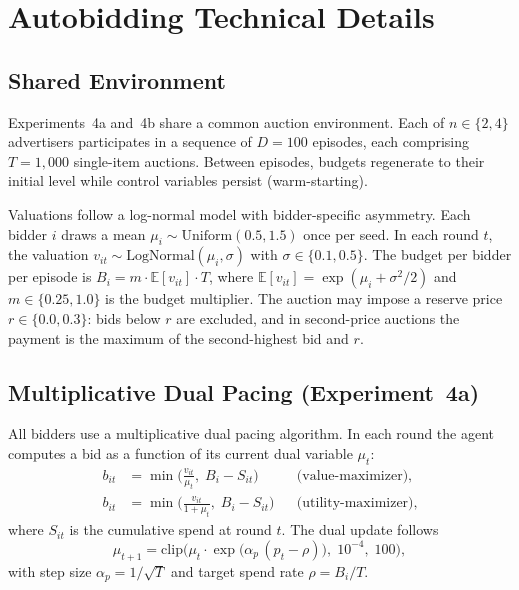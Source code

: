 \section{Autobidding Technical Details}
\label{sec:exp4_appendix}

\subsection{Shared Environment}

Experiments~4a and~4b share a common auction environment. Each of $n \in \{2, 4\}$ advertisers participates in a sequence of $D = 100$ episodes, each comprising $T = 1{,}000$ single-item auctions. Between episodes, budgets regenerate to their initial level while control variables persist (warm-starting).

Valuations follow a log-normal model with bidder-specific asymmetry. Each bidder $i$ draws a mean $\mu_i \sim \mathrm{Uniform}(0.5, 1.5)$ once per seed. In each round $t$, the valuation $v_{it} \sim \mathrm{LogNormal}(\mu_i, \sigma)$ with $\sigma \in \{0.1, 0.5\}$. The budget per bidder per episode is $B_i = m \cdot \mathbb{E}[v_{it}] \cdot T$, where $\mathbb{E}[v_{it}] = \exp(\mu_i + \sigma^2/2)$ and $m \in \{0.25, 1.0\}$ is the budget multiplier. The auction may impose a reserve price $r \in \{0.0, 0.3\}$: bids below $r$ are excluded, and in second-price auctions the payment is the maximum of the second-highest bid and $r$.

\subsection{Multiplicative Dual Pacing (Experiment~4a)}
\label{sec:exp4a_appendix}

All bidders use a multiplicative dual pacing algorithm. In each round the agent computes a bid as a function of its current dual variable $\mu_t$:
\begin{align}
  b_{it} &= \min\!\Big(\frac{v_{it}}{\mu_t},\; B_i - S_{it}\Big) & &\text{(value-maximizer),} \label{eq:bid_vmax} \\
  b_{it} &= \min\!\Big(\frac{v_{it}}{1 + \mu_t},\; B_i - S_{it}\Big) & &\text{(utility-maximizer),} \label{eq:bid_umax}
\end{align}
where $S_{it}$ is the cumulative spend at round $t$. The dual update follows
\begin{equation}
  \mu_{t+1} = \mathrm{clip}\!\Big(\mu_t \cdot \exp\!\big(\alpha_p\,(p_t - \rho)\big),\; 10^{-4},\; 100\Big),
  \label{eq:dual_update_exp4a}
\end{equation}
with step size $\alpha_p = 1/\sqrt{T}$ and target spend rate $\rho = B_i / T$.


